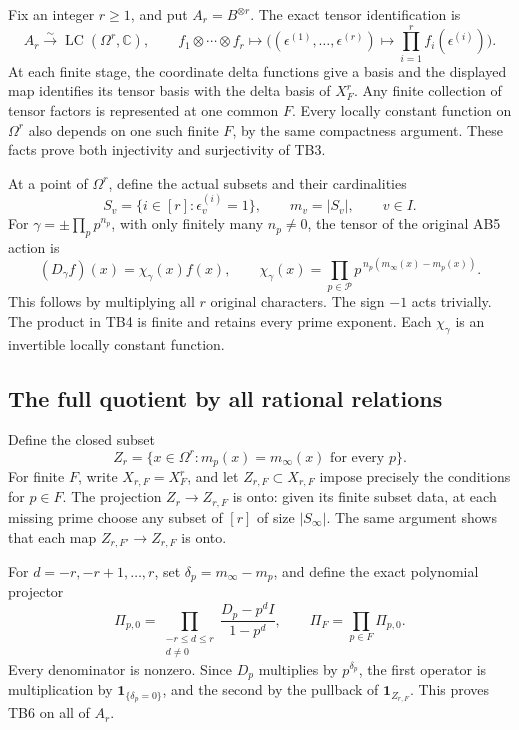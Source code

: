 Fix an integer \(r\ge1\), and put \(A_r=B^{\otimes r}\).
The exact tensor identification is
\[
A_r\xrightarrow{\sim}\operatorname{LC}(\Omega^r,\mathbb C),
\qquad
f_1\otimes\cdots\otimes f_r\longmapsto
 \bigl((\epsilon^{(1)},\ldots,\epsilon^{(r)})
          \mapsto\prod_{i=1}^r f_i(\epsilon^{(i)})\bigr).
\tag{TB3}
\]
At each finite stage, the coordinate delta functions give a basis
and the displayed map identifies its tensor basis with the delta
basis of \(X_F^r\). Any finite collection of tensor factors is
represented at one common \(F\). Every locally constant function
on \(\Omega^r\) also depends on one such finite \(F\), by the same
compactness argument. These facts prove both injectivity and
surjectivity of TB3.

At a point of \(\Omega^r\), define the actual subsets and their
cardinalities
\[
S_v=\{i\in[r]:\epsilon_v^{(i)}=1\},\qquad
m_v=|S_v|,\qquad v\in I.
\]
For \(\gamma=\pm\prod_p p^{n_p}\), with only finitely many
\(n_p\ne0\), the tensor of the original AB5 action is
\[
(D_\gamma f)(x)=\chi_\gamma(x)f(x),\qquad
\chi_\gamma(x)=
 \prod_{p\in\mathcal P}p^{\,n_p(m_\infty(x)-m_p(x))}.
\tag{TB4}
\]
This follows by multiplying all \(r\) original characters.
The sign \(-1\) acts trivially. The product in TB4 is finite and
retains every prime exponent. Each \(\chi_\gamma\) is an invertible
locally constant function.

\subsection{The full quotient by all rational relations}

Define the closed subset
\[
Z_r=\{x\in\Omega^r:m_p(x)=m_\infty(x)\text{ for every }p\}.
\tag{TB5}
\]
For finite \(F\), write \(X_{r,F}=X_F^r\), and let
\(Z_{r,F}\subset X_{r,F}\) impose precisely the conditions for
\(p\in F\). The projection \(Z_r\to Z_{r,F}\) is onto: given its
finite subset data, at each missing prime choose any subset of
\([r]\) of size \(|S_\infty|\). The same argument shows that
each map \(Z_{r,F'}\to Z_{r,F}\) is onto.

For \(d=-r,-r+1,\ldots,r\), set
\(\delta_p=m_\infty-m_p\), and define the exact polynomial projector
\[
\Pi_{p,0}=
\prod_{\substack{-r\le d\le r\\d\ne0}}
              \frac{D_p-p^d I}{1-p^d},\qquad
\Pi_F=\prod_{p\in F}\Pi_{p,0}.
\tag{TB6}
\]
Every denominator is nonzero. Since \(D_p\) multiplies by
\(p^{\delta_p}\), the first operator is multiplication by
\(\mathbf1_{\{\delta_p=0\}}\), and the second by the pullback of
\(\mathbf1_{Z_{r,F}}\). This proves TB6 on all of \(A_r\).

